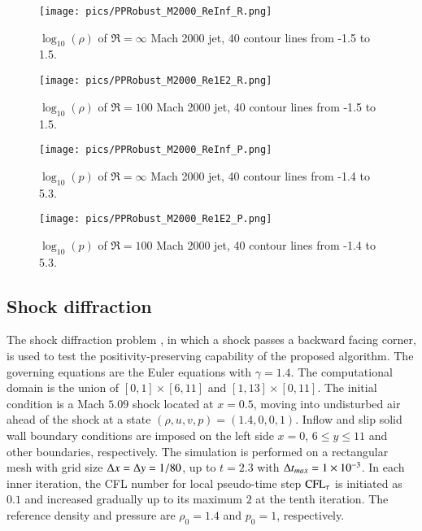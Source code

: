 \begin{figure}[htbp]
    \centering
    \texttt{[image: pics/PPRobust\_M2000\_ReInf\_R.png]}
    \caption{$\log_{10}(\rho)$ of $\Re=\infty$ Mach 2000 jet, 40 contour lines from -1.5 to 1.5.}
    \label{fig:M2000_ReInf_R}
\end{figure}

\begin{figure}[htbp]
    \centering
    \texttt{[image: pics/PPRobust\_M2000\_Re1E2\_R.png]}
    \caption{$\log_{10}(\rho)$ of $\Re=100$ Mach 2000 jet, 40 contour lines from -1.5 to 1.5.}
    \label{fig:M2000_Re1E2_R}
\end{figure}

\begin{figure}[htbp]
    \centering
    \texttt{[image: pics/PPRobust\_M2000\_ReInf\_P.png]}
    \caption{$\log_{10}(p)$ of $\Re=\infty$ Mach 2000 jet, 40 contour lines from -1.4 to 5.3.}
    \label{fig:M2000_ReInf_P}
\end{figure}

\begin{figure}[htbp]
    \centering
    \texttt{[image: pics/PPRobust\_M2000\_Re1E2\_P.png]}
    \caption{$\log_{10}(p)$ of $\Re=100$ Mach 2000 jet, 40 contour lines from -1.4 to 5.3.}
    \label{fig:M2000_Re1E2_P}
\end{figure}

\subsection{Shock diffraction}

The shock diffraction problem \cite{zhang2010positivity}, in which a shock passes a backward facing corner,
is used to test the positivity-preserving capability of the proposed algorithm.
The governing equations are the Euler equations with $\gamma = 1.4$.
The computational domain is the union of $[0,1]\times[6,11]$ and $[1,13]\times[0,11]$.
The initial condition is a Mach $5.09$ shock located at $x=0.5$,
moving into undisturbed air ahead of the shock at a state $(\rho, u, v, p)=(1.4,0,0,1)$.
Inflow and slip solid wall boundary conditions are imposed on
the left side $x = 0$, $6\leq y \leq 11$ and other boundaries, respectively.
The simulation is performed on a rectangular mesh with grid size $\mathrm\Delta x = \mathrm\Delta y = 1/80$,
up to $t=2.3$ with $\mathrm\Delta t_{max}=1\times 10^{-3}$.
In each inner iteration, the CFL number for local pseudo-time step $\text{CFL}_\tau$ is initiated as $0.1$
and increased gradually up to its maximum $2$ at the tenth iteration.
The reference density and pressure are $\rho_0=1.4$ and $p_0=1$, respectively.

